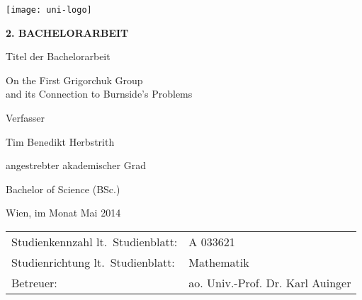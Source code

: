 \begin{titlepage}
\begin{flushright}
    \texttt{[image: uni-logo]}
\end{flushright}
\vspace{1cm}

\begin{center}  %
    \Huge{\textbf{\textsf{\MakeUppercase{
        2. Bachelorarbeit
    }}}}
    \vspace{2cm}

    \large{\textsf{  %
        Titel der Bachelorarbeit
    }}
    \vspace{.1cm}

    \LARGE{\textsf{  On the First Grigorchuk Group\\
    and its Connection to Burnside's Problems
    }}
    \vspace{2.5cm}

    \large{\textsf{  %
        Verfasser
    }}

    \Large{\textsf{  Tim Benedikt Herbstrith
    }}
    \vspace{3cm}

    \large{\textsf{
        angestrebter akademischer Grad  %
    }}

    \Large{\textsf{  %
        Bachelor of Science (BSc.)
    }}
\end{center}
\vspace{2cm}

\noindent\textsf{Wien, im Monat Mai 2014}  %
\vfill

\noindent\begin{tabular}{@{}ll}
\textsf{Studienkennzahl lt.\ Studienblatt:}
&
\textsf{A 033621}  %
\\
\textsf{Studienrichtung lt.\ Studienblatt:}
&
\textsf{Mathematik}  %
\\
\textsf{Betreuer: }
&
\textsf{ao. Univ.-Prof. Dr. Karl Auinger}  %
\end{tabular}

\end{titlepage}

